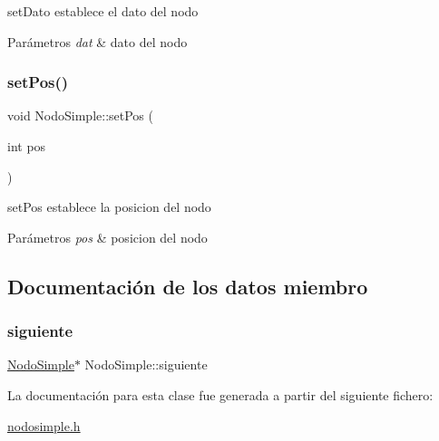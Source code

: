 set\+Dato establece el dato del nodo 


\begin{DoxyParams}{Parámetros}
{\em dat} & dato del nodo \\
\hline
\end{DoxyParams}
\mbox{\label{class_nodo_simple_a455c9a0f62ba752d4e29e54fd588cdd1}} 
\subsubsection{\texorpdfstring{set\+Pos()}{setPos()}}
{\footnotesize\ttfamily void Nodo\+Simple\+::set\+Pos (\begin{DoxyParamCaption}\item[{int}]{pos }\end{DoxyParamCaption})\hspace{0.3cm}{\ttfamily [inline]}}



set\+Pos establece la posicion del nodo 


\begin{DoxyParams}{Parámetros}
{\em pos} & posicion del nodo \\
\hline
\end{DoxyParams}


\subsection{Documentación de los datos miembro}
\mbox{\label{class_nodo_simple_a7ef0a1b5d9ee22ee78dfbf29e25e8450}} 
\subsubsection{\texorpdfstring{siguiente}{siguiente}}
{\footnotesize\ttfamily \mbox{\hyperlink{class_nodo_simple}{Nodo\+Simple}}$\ast$ Nodo\+Simple\+::siguiente}



La documentación para esta clase fue generada a partir del siguiente fichero\+:\begin{DoxyCompactItemize}
\item 
\mbox{\hyperlink{nodosimple_8h}{nodosimple.\+h}}\end{DoxyCompactItemize}
